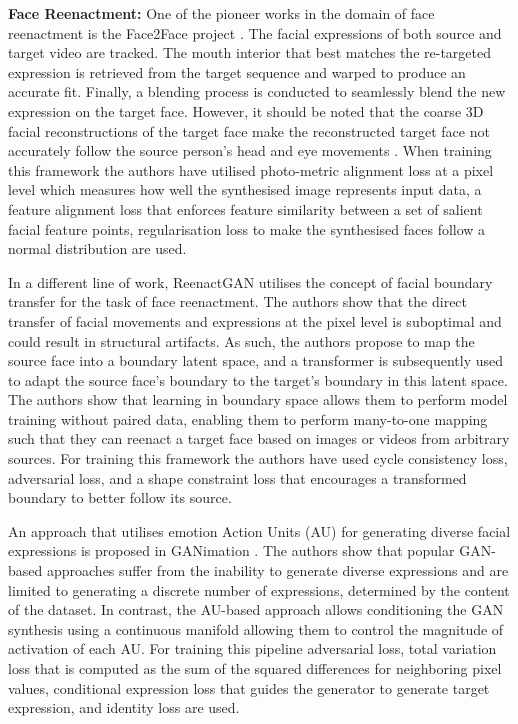 \noindent \textbf{Face Reenactment:} One of the pioneer works in the domain of face reenactment is the Face2Face project \cite{thies2016face2face}.  The facial expressions of both source and target video are tracked. The mouth interior that best matches the re-targeted expression is retrieved from the target sequence and warped to produce an accurate fit. Finally, a blending process is conducted to seamlessly blend the new expression on the target face. However, it should be noted that the coarse 3D facial reconstructions of the target face make the reconstructed target face not accurately follow the source person’s head and eye movements \cite{waseem2023deepfake}. When training this framework the authors have utilised photo-metric alignment loss at a pixel level which measures how well the synthesised image represents input data, a feature alignment loss that enforces feature similarity between a set of salient facial feature points, regularisation loss to make the synthesised faces follow a normal distribution are used.

In a different line of work, ReenactGAN \cite{wu2018reenactgan} utilises the concept of facial boundary transfer for the task of face reenactment. The authors show that the direct transfer of facial movements and expressions at the pixel level is suboptimal and could result in structural artifacts. As such, the authors propose to map the source face into a boundary latent space, and a transformer is subsequently used to adapt the source face’s boundary to the target’s boundary in this latent space. The authors show that learning in boundary space allows them to perform model training without paired data, enabling them to perform many-to-one mapping such that they can reenact a target face based on images or videos from arbitrary sources. For training this framework the authors have used cycle consistency loss, adversarial loss, and a shape constraint loss that encourages a transformed boundary to better follow its source.

An approach that utilises emotion Action Units (AU) for generating diverse facial expressions is proposed in GANimation \cite{pumarola2018ganimation}. The authors show that popular GAN-based approaches suffer from the inability to generate diverse expressions and are limited to generating a discrete number of expressions, determined by the content of the dataset. In contrast, the AU-based approach allows conditioning the GAN synthesis using a continuous manifold allowing them to control the magnitude of activation of each AU. For training this pipeline adversarial loss, total variation loss that is computed as the sum of the squared differences for neighboring pixel values, conditional expression loss that guides the generator to generate target expression, and identity loss are used. 

